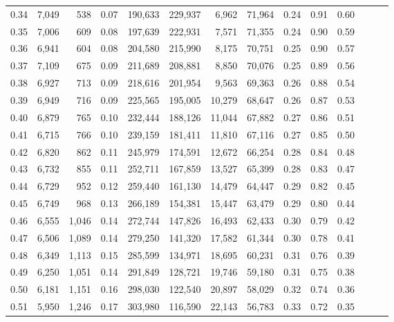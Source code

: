 \begin{tabular}{rrrrrrrrrrrrrr}
0.34 &   7,049 &    538 &  0.07 &  190,633 &  229,937 &   6,962 &  71,964 &  0.24 &  0.91 &      0.60 \\
0.35 &   7,006 &    609 &  0.08 &  197,639 &  222,931 &   7,571 &  71,355 &  0.24 &  0.90 &      0.59 \\
0.36 &   6,941 &    604 &  0.08 &  204,580 &  215,990 &   8,175 &  70,751 &  0.25 &  0.90 &      0.57 \\
0.37 &   7,109 &    675 &  0.09 &  211,689 &  208,881 &   8,850 &  70,076 &  0.25 &  0.89 &      0.56 \\
0.38 &   6,927 &    713 &  0.09 &  218,616 &  201,954 &   9,563 &  69,363 &  0.26 &  0.88 &      0.54 \\
0.39 &   6,949 &    716 &  0.09 &  225,565 &  195,005 &  10,279 &  68,647 &  0.26 &  0.87 &      0.53 \\
0.40 &   6,879 &    765 &  0.10 &  232,444 &  188,126 &  11,044 &  67,882 &  0.27 &  0.86 &      0.51 \\
0.41 &   6,715 &    766 &  0.10 &  239,159 &  181,411 &  11,810 &  67,116 &  0.27 &  0.85 &      0.50 \\
0.42 &   6,820 &    862 &  0.11 &  245,979 &  174,591 &  12,672 &  66,254 &  0.28 &  0.84 &      0.48 \\
0.43 &   6,732 &    855 &  0.11 &  252,711 &  167,859 &  13,527 &  65,399 &  0.28 &  0.83 &      0.47 \\
0.44 &   6,729 &    952 &  0.12 &  259,440 &  161,130 &  14,479 &  64,447 &  0.29 &  0.82 &      0.45 \\
0.45 &   6,749 &    968 &  0.13 &  266,189 &  154,381 &  15,447 &  63,479 &  0.29 &  0.80 &      0.44 \\
0.46 &   6,555 &  1,046 &  0.14 &  272,744 &  147,826 &  16,493 &  62,433 &  0.30 &  0.79 &      0.42 \\
0.47 &   6,506 &  1,089 &  0.14 &  279,250 &  141,320 &  17,582 &  61,344 &  0.30 &  0.78 &      0.41 \\
0.48 &   6,349 &  1,113 &  0.15 &  285,599 &  134,971 &  18,695 &  60,231 &  0.31 &  0.76 &      0.39 \\
0.49 &   6,250 &  1,051 &  0.14 &  291,849 &  128,721 &  19,746 &  59,180 &  0.31 &  0.75 &      0.38 \\
0.50 &   6,181 &  1,151 &  0.16 &  298,030 &  122,540 &  20,897 &  58,029 &  0.32 &  0.74 &      0.36 \\
0.51 &   5,950 &  1,246 &  0.17 &  303,980 &  116,590 &  22,143 &  56,783 &  0.33 &  0.72 &      0.35 \\

\end{tabular}
